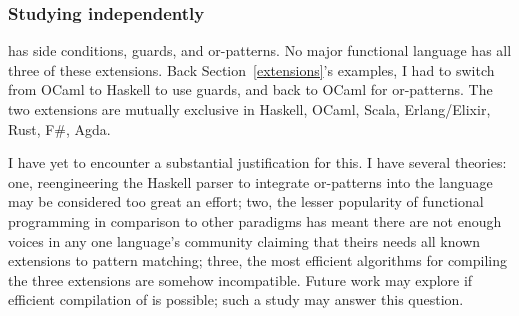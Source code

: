 \documentclass[manuscript,screen,review, 12pt, nonacm]{acmart}
\begin{document}

            
            
            



        \subsubsection{Studying \PPlus independently}
        \label{pplusindependently}
        \PPlus has side conditions, guards, and or-patterns. No major
        functional language has all three of these extensions. Back
        Section~\ref{extensions}'s examples, I had to switch from OCaml to
        Haskell to use guards, and back to OCaml for or-patterns. The two
        extensions are mutually exclusive in Haskell, OCaml, Scala,
        Erlang/Elixir, Rust, F\#, Agda.~\citep{haskell, ocaml, scala, erlang,
        elixir, rust, fsharp, agda}

        I have yet to encounter a substantial justification for this. I have
        several theories: one, reengineering the Haskell parser to integrate
        or-patterns into the language may be considered too great an effort;
        two, the lesser popularity of functional programming in comparison to
        other paradigms has meant there are not enough voices in any one
        language's community claiming that theirs needs all known extensions to
        pattern matching; three, the most efficient algorithms for compiling the
        three extensions are somehow incompatible. Future work may explore if
        efficient compilation of \PPlus is possible; such a study may answer this
        question. 
\end{document}
